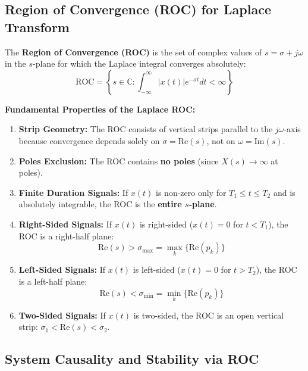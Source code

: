 \documentclass[12pt,a4paper]{article}
\begin{document}
\subsection{Region of Convergence (ROC) for Laplace Transform}

\begin{tcolorbox}[defbox, title={\textbf{Definition: Region of Convergence (ROC)}}]
The \textbf{Region of Convergence (ROC)} is the set of complex values of $s = \sigma + j\omega$ in the $s$-plane for which the Laplace integral converges absolutely:
\begin{equation}
  \text{ROC} = \left\{ s \in \mathbb{C} : \int_{-\infty}^{\infty} |x(t)| e^{-\sigma t} dt < \infty \right\}
\end{equation}
\end{tcolorbox}

\textbf{Fundamental Properties of the Laplace ROC:}
\begin{enumerate}[topsep=2pt, itemsep=3pt]
  \item \textbf{Strip Geometry:} The ROC consists of vertical strips parallel to the $j\omega$-axis because convergence depends solely on $\sigma = \text{Re}(s)$, not on $\omega = \text{Im}(s)$.
  \item \textbf{Poles Exclusion:} The ROC contains \textbf{no poles} (since $X(s) \to \infty$ at poles).
  \item \textbf{Finite Duration Signals:} If $x(t)$ is non-zero only for $T_1 \le t \le T_2$ and is absolutely integrable, the ROC is the \textbf{entire $s$-plane}.
  \item \textbf{Right-Sided Signals:} If $x(t)$ is right-sided ($x(t) = 0$ for $t < T_1$), the ROC is a right-half plane:
  \begin{equation}
    \text{Re}(s) > \sigma_{\max} = \max_k\{\text{Re}(p_k)\}
  \end{equation}
  \item \textbf{Left-Sided Signals:} If $x(t)$ is left-sided ($x(t) = 0$ for $t > T_2$), the ROC is a left-half plane:
  \begin{equation}
    \text{Re}(s) < \sigma_{\min} = \min_k\{\text{Re}(p_k)\}
  \end{equation}
  \item \textbf{Two-Sided Signals:} If $x(t)$ is two-sided, the ROC is an open vertical strip: $\sigma_1 < \text{Re}(s) < \sigma_2$.
\end{enumerate}

\subsection{System Causality and Stability via ROC}
\end{document}
